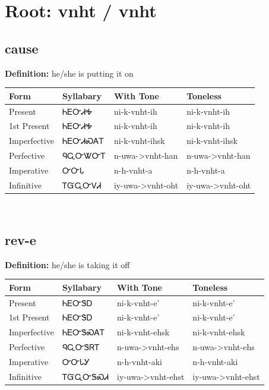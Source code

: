 \documentclass{article}%
\begin{document}
%
\normalsize%
\section*{Root: vnht / vnht}%
\subsection*{cause}%
\textbf{Definition: }%
he/she is putting it on%
\\[0.5em]%
\begin{tabular}{|l|l|l|l|}%
\hline%
\textbf{Form}&\textbf{Syllabary}&\textbf{With Tone}&\textbf{Toneless}\\%
\hline%
Present&ᏂᎬᏅᏗᎭ&ni{-}k{-}vnht{-}ih&ni{-}k{-}vnht{-}ih\\%
1st Present&ᏂᎬᏅᏗᎭ&ni{-}k{-}vnht{-}ih&ni{-}k{-}vnht{-}ih\\%
Imperfective&ᏂᎬᏅᏗᏍᎪᎢ&ni{-}k{-}vnht{-}ihsk&ni{-}k{-}vnht{-}ihsk\\%
Perfective&ᏄᏩᏅᏔᏅᎢ&n{-}uwa{-}>vnht{-}han&n{-}uwa{-}>vnht{-}han\\%
Imperative&ᏅᏅᏓ&n{-}h{-}vnht{-}a&n{-}h{-}vnht{-}a\\%
Infinitive&ᎢᏳᏩᏅᏙᏗ&iy{-}uwa{-}>vnht{-}oht&iy{-}uwa{-}>vnht{-}oht\\%
\hline%
\end{tabular}%
\\[1em]%
\subsection*{rev-e}%
\textbf{Definition: }%
he/she is taking it off%
\\[0.5em]%
\begin{tabular}{|l|l|l|l|}%
\hline%
\textbf{Form}&\textbf{Syllabary}&\textbf{With Tone}&\textbf{Toneless}\\%
\hline%
Present&ᏂᎬᏅᏕᎠ&ni{-}k{-}vnht{-}e'&ni{-}k{-}vnht{-}e'\\%
1st Present&ᏂᎬᏅᏕᎠ&ni{-}k{-}vnht{-}e'&ni{-}k{-}vnht{-}e'\\%
Imperfective&ᏂᎬᏅᏕᏍᎪᎢ&ni{-}k{-}vnht{-}ehsk&ni{-}k{-}vnht{-}ehsk\\%
Perfective&ᏄᏩᏅᏕᏒᎢ&n{-}uwa{-}>vnht{-}ehs&n{-}uwa{-}>vnht{-}ehs\\%
Imperative&ᏅᏅᏓᎩ&n{-}h{-}vnht{-}aki&n{-}h{-}vnht{-}aki\\%
Infinitive&ᎢᏳᏩᏅᏕᏍᏗ&iy{-}uwa{-}>vnht{-}ehst&iy{-}uwa{-}>vnht{-}ehst\\%
\hline%
\end{tabular}%
\\[1em]%
\end{document}
